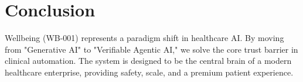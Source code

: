 \documentclass[12pt,a4paper]{article}
\begin{document}
\section{Conclusion}
Wellbeing (WB-001) represents a paradigm shift in healthcare AI. By moving from "Generative AI" to "Verifiable Agentic AI," we solve the core trust barrier in clinical automation. The system is designed to be the central brain of a modern healthcare enterprise, providing safety, scale, and a premium patient experience.
\end{document}
